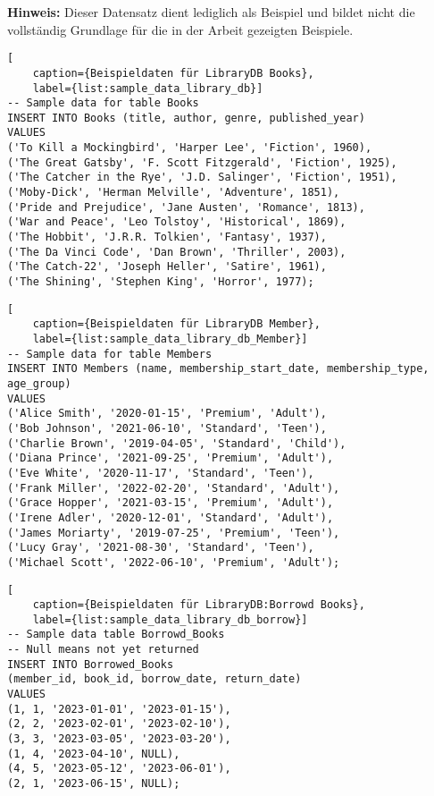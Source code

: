 \label{sec:library_db_sample_data}
\textbf{Hinweis:} Dieser Datensatz dient lediglich als Beispiel und bildet nicht
die vollständig Grundlage für die in der Arbeit gezeigten Beispiele.

\begin{lstlisting}[
    caption={Beispieldaten für LibraryDB Books},
    label={list:sample_data_library_db}]
-- Sample data for table Books
INSERT INTO Books (title, author, genre, published_year)
VALUES
('To Kill a Mockingbird', 'Harper Lee', 'Fiction', 1960),
('The Great Gatsby', 'F. Scott Fitzgerald', 'Fiction', 1925),
('The Catcher in the Rye', 'J.D. Salinger', 'Fiction', 1951),
('Moby-Dick', 'Herman Melville', 'Adventure', 1851),
('Pride and Prejudice', 'Jane Austen', 'Romance', 1813),
('War and Peace', 'Leo Tolstoy', 'Historical', 1869),
('The Hobbit', 'J.R.R. Tolkien', 'Fantasy', 1937),
('The Da Vinci Code', 'Dan Brown', 'Thriller', 2003),
('The Catch-22', 'Joseph Heller', 'Satire', 1961),
('The Shining', 'Stephen King', 'Horror', 1977);
\end{lstlisting}

\begin{lstlisting}[
    caption={Beispieldaten für LibraryDB Member},
    label={list:sample_data_library_db_Member}]
-- Sample data for table Members
INSERT INTO Members (name, membership_start_date, membership_type, age_group)
VALUES
('Alice Smith', '2020-01-15', 'Premium', 'Adult'),
('Bob Johnson', '2021-06-10', 'Standard', 'Teen'),
('Charlie Brown', '2019-04-05', 'Standard', 'Child'),
('Diana Prince', '2021-09-25', 'Premium', 'Adult'),
('Eve White', '2020-11-17', 'Standard', 'Teen'),
('Frank Miller', '2022-02-20', 'Standard', 'Adult'),
('Grace Hopper', '2021-03-15', 'Premium', 'Adult'),
('Irene Adler', '2020-12-01', 'Standard', 'Adult'),
('James Moriarty', '2019-07-25', 'Premium', 'Teen'),
('Lucy Gray', '2021-08-30', 'Standard', 'Teen'),
('Michael Scott', '2022-06-10', 'Premium', 'Adult');
\end{lstlisting}

\filbreak

\begin{lstlisting}[
    caption={Beispieldaten für LibraryDB:Borrowd Books},
    label={list:sample_data_library_db_borrow}]
-- Sample data table Borrowd_Books
-- Null means not yet returned
INSERT INTO Borrowed_Books
(member_id, book_id, borrow_date, return_date)
VALUES
(1, 1, '2023-01-01', '2023-01-15'),
(2, 2, '2023-02-01', '2023-02-10'),
(3, 3, '2023-03-05', '2023-03-20'),
(1, 4, '2023-04-10', NULL),
(4, 5, '2023-05-12', '2023-06-01'),
(2, 1, '2023-06-15', NULL);
\end{lstlisting}
